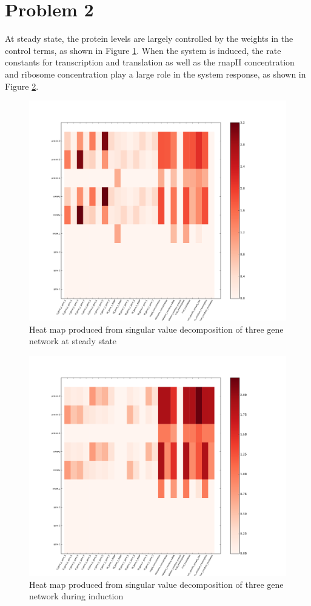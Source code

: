 \documentclass{article}
\begin{document}
\section*{Problem 2}
At steady state, the protein levels are largely controlled by the weights in the control terms, as shown in Figure \ref{fig:P2SS}. When the system is induced, the rate constants for transcription and translation as well as the rnapII concentration and ribosome concentration play a large role in the system response, as shown in Figure \ref{fig:P2Induced}.

\begin{figure}[h]
\includegraphics[width=12cm]{../ThreeGeneRachelV2/figures/ParameterSpeciesInteractionsFrom0to10}
\caption{Heat map produced from singular value decomposition of three gene network at steady state}
\label{fig:P2SS}
\end{figure}

\begin{figure}[h!]
\includegraphics[width=12cm]{../ThreeGeneRachelV2/figures/ParameterSpeciesInteractionsFrom10to70}
\caption{Heat map produced from singular value decomposition of three gene network during induction}
\label{fig:P2Induced}
\end{figure}
\end{document}
